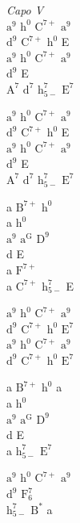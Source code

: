 \begin{chord}
    \textit{Capo V}\\
    $\mathrm{a^{9}}$ $\mathrm{h^{0}}$ $\mathrm{C^{7+}}$ $\mathrm{a^{9}}$\\
    $\mathrm{d^{9}}$ $\mathrm{C^{7+}}$ $\mathrm{h^{0}}$ E\\
    $\mathrm{a^{9}}$ $\mathrm{h^{0}}$ $\mathrm{C^{7+}}$ $\mathrm{a^{9}}$\\
    $\mathrm{d^9}$ E\\
    $\mathrm{A^{7}}$ $\mathrm{d^{7}}$ $\mathrm{h_{5-}^{7}}$ $\mathrm{E^{7}}$

    $\mathrm{a^{9}}$ $\mathrm{h^{0}}$ $\mathrm{C^{7+}}$ $\mathrm{a^{9}}$\\
    $\mathrm{d^{9}}$ $\mathrm{C^{7+}}$ $\mathrm{h^{0}}$ E\\
    $\mathrm{a^{9}}$ $\mathrm{h^{0}}$ $\mathrm{C^{7+}}$ $\mathrm{a^{9}}$\\
    $\mathrm{d^9}$ E\\
    $\mathrm{A^{7}}$ $\mathrm{d^{7}}$ $\mathrm{h_{5-}^{7}}$ $\mathrm{E^{7}}$

    a $\mathrm{B^{7+}}$ $\mathrm{h^{0}}$\\
    a $\mathrm{h^{0}}$\\
    $\mathrm{a^{9}}$ $\mathrm{a^{G}}$ $\mathrm{D^{9}}$\\
    d E\\
    a $\mathrm{F^{7+}}$\\
    a $\mathrm{C^{7+}}$ $\mathrm{h_{5-}^{7}}$ E

    $\mathrm{a^{9}}$ $\mathrm{h^{0}}$ $\mathrm{C^{7+}}$ $\mathrm{a^{9}}$\\
    $\mathrm{d^{9}}$ $\mathrm{C^{7+}}$ $\mathrm{h^{0}}$ $\mathrm{E^{7}}$\\
    $\mathrm{a^{9}}$ $\mathrm{h^{0}}$ $\mathrm{C^{7+}}$ $\mathrm{a^{9}}$\\
    $\mathrm{d^{9}}$ $\mathrm{C^{7+}}$ $\mathrm{h^{0}}$ $\mathrm{E^{7}}$

    a $\mathrm{B^{7+}}$ $\mathrm{h^{0}}$ a\\
    a $\mathrm{h^{0}}$\\
    $\mathrm{a^{9}}$ $\mathrm{a^{G}}$ $\mathrm{D^{9}}$\\
    d E\\
    a $\mathrm{h_{5-}^{7}}$ $\mathrm{E^{7}}$

    $\mathrm{a^{9}}$ $\mathrm{h^{0}}$ $\mathrm{C^{7+}}$ $\mathrm{a^{9}}$\\
    $\mathrm{d^{9}}$ $\mathrm{F_{6}^{7}}$\\
    $\mathrm{h_{5-}^{7}}$ $\mathrm{B^{*}}$ a


\end{chord}
